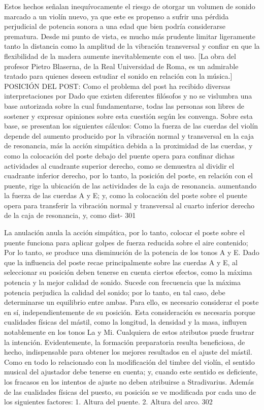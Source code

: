Estos hechos señalan inequívocamente el riesgo de otorgar un volumen de sonido marcado a un violín nuevo, ya que este es propenso a sufrir una pérdida perjudicial de potencia sonora a una edad que bien podría considerarse prematura. Desde mi punto de vista, es mucho más prudente limitar ligeramente tanto la distancia como la amplitud de la vibración transversal y confiar en que la flexibilidad de la madera aumente inevitablemente con el uso.
[La obra del profesor Pietro Blaserna, de la Real Universidad de Roma, es un admirable tratado para quienes deseen estudiar el sonido en relación con la música.]
POSICIÓN DEL POST: Como el problema del post ha recibido diversas interpretaciones por
Dado que existen diferentes filósofos y no se vislumbra una base autorizada sobre la cual fundamentarse, todas las personas son libres de sostener y expresar opiniones sobre esta cuestión según les convenga. Sobre esta base, se presentan los siguientes cálculos: Como la fuerza de las cuerdas del violín depende del aumento producido por la vibración normal y transversal en la caja de resonancia, más la acción simpática debida a la proximidad de las cuerdas, y como la colocación del poste debajo del puente opera para confinar dichas actividades al cuadrante superior derecho, como se demuestra al dividir el cuadrante inferior derecho, por lo tanto, la posición del poste, en relación con el puente, rige la ubicación de las actividades de la caja de resonancia.
aumentando la fuerza de las cuerdas A y E; y, como la colocación del poste sobre el puente opera para transferir la vibración normal y transversal al cuarto inferior derecho de la caja de resonancia, y, como dist-
301

La anulación anula la acción simpática, por lo tanto, colocar el poste sobre el puente funciona para aplicar golpes de fuerza reducida sobre el aire contenido;
Por lo tanto, se produce una disminución de la potencia de los tonos A y E.
Dado que la influencia del poste recae principalmente sobre las cuerdas A y E, al seleccionar su posición deben tenerse en cuenta ciertos efectos, como la máxima potencia y la mejor calidad de sonido. Sucede con frecuencia que la máxima potencia perjudica la calidad del sonido; por lo tanto, en tal caso, debe determinarse un equilibrio entre ambas. Para ello, es necesario considerar el poste en sí, independientemente de su posición.
Esta consideración es necesaria porque cualidades físicas del mástil, como la longitud, la densidad y la masa, influyen notablemente en los tonos La y Mi. Cualquiera de estos atributos puede frustrar la intención. Evidentemente, la formación preparatoria resulta beneficiosa, de hecho, indispensable para obtener los mejores resultados en el ajuste del mástil. Como en todo lo relacionado con la modificación del timbre del violín, el sentido musical del ajustador debe tenerse en cuenta; y, cuando este sentido es deficiente, los fracasos en los intentos de ajuste no deben atribuirse a Stradivarius.
Además de las cualidades físicas del puesto, su posición se ve modificada por cada uno de los siguientes factores:
1. Altura del puente.
2. Altura del arco.
302

